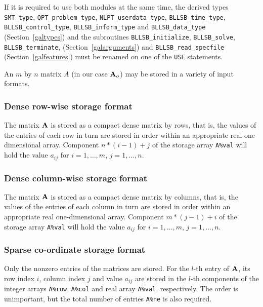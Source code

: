 \documentclass{galahad}
\newcommand{\packagename}{BLLSB}
\begin{document}
\medskip

\noindent
If it is required to use both modules at the same time, the derived types
{\tt SMT\_type},
{\tt QPT\_problem\_type},
{\tt NLPT\_userdata\-\_type},
{\tt \packagename\_time\_type},
{\tt \packagename\_control\_type},
{\tt \packagename\_inform\_type}
and
{\tt \packagename\_data\_type}
(Section~\ref{galtypes})
and the subroutines
{\tt \packagename\_initialize},
{\tt \packagename\_\-solve},
{\tt \packagename\_terminate},
(Section~\ref{galarguments})
and
{\tt \packagename\_read\_specfile}
(Section~\ref{galfeatures})
must be renamed on one of the {\tt USE} statements.


\galmatrix
An $m$ by $n$ matrix $A$ (in our case ${\mathbf{A}}_o$)
may be stored in a variety of input formats.

\subsubsection{Dense row-wise storage format}\label{dense}
The matrix ${\mathbf{A}}$ is stored as a compact
dense matrix by rows, that is, the values of the entries of each row in turn are
stored in order within an appropriate real one-dimensional array.
Component $n \ast (i-1) + j$ of the storage array {\tt A\%val} will hold the
value $a_{ij}$ for $i = 1, \ldots , m$, $j = 1, \ldots , n$.

\subsubsection{Dense column-wise storage format}\label{densecolumnwise}
The matrix ${\mathbf{A}}$ is stored as a compact
dense matrix by columns, that is, the values of the entries of each column
in turn are stored in order within an appropriate real one-dimensional array.
Component $m \ast (j-1) + i$ of the storage array {\tt A\%val} will hold the
value $a_{ij}$ for $i = 1, \ldots , m$, $j = 1, \ldots , n$.

\subsubsection{Sparse co-ordinate storage format}\label{coordinate}
Only the nonzero entries of the matrices are stored. For the
$l$-th entry of ${\mathbf{A}}$, its row index $i$, column index $j$
and value $a_{ij}$
are stored in the $l$-th components of the integer arrays {\tt A\%row},
{\tt A\%col} and real array {\tt A\%val}, respectively.
The order is unimportant, but the total
number of entries {\tt A\%ne} is also required.
\end{document}
